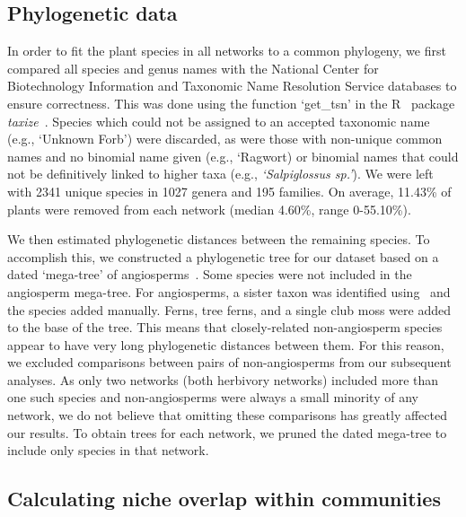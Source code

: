 \documentclass[12pt]{article}
\begin{document}
\begin{spacing}{1.5}
  \subsection*{Phylogenetic data}

    In order to fit the plant species in all networks to a common phylogeny, 
    we first compared all species and genus names with the 
    National Center for Biotechnology Information
    and Taxonomic Name Resolution Service databases to ensure
    correctness. This was done using the function `get\_tsn' in the R~\citep{R}
    package \emph{taxize}~\citep{taxize1,taxize2}. Species which could not 
    be assigned to an accepted taxonomic name (e.g., `Unknown Forb') were 
    discarded, as were those with non-unique common names and no binomial 
    name given (e.g., `Ragwort) or binomial names that could not be definitively 
    linked to  higher taxa (e.g., \emph{`Salpiglossus sp.'}). We were left with 
    2341 unique species in 1027 genera and 195 families. On average, 11.43\% of 
    plants were removed from each network (median 4.60\%, range 0-55.10\%).


    We then estimated phylogenetic distances between the remaining species. To accomplish 
    this, we constructed a phylogenetic tree for our dataset based on a dated
    `mega-tree' of angiosperms~\citep{Zanne2014}. Some species were not included
    in the angiosperm mega-tree. For angiosperms,
    a sister taxon was identified using~\citet{APW} and the species added manually.
    Ferns, tree ferns, and a single club moss were added to the base of the tree.
    This means that closely-related non-angiosperm species appear to have very long 
    phylogenetic distances between them. For this reason, we excluded comparisons 
    between pairs of non-angiosperms from our subsequent analyses. As only two networks (both 
    herbivory networks) included more than one such species and non-angiosperms
    were always a small minority of any network, we do not 
    believe that omitting these comparisons has greatly affected our results.
    To obtain trees for each network, we 
    pruned the dated mega-tree to include only species in that network.


  \subsection*{Calculating niche overlap within communities}


\end{spacing}
\end{document}
